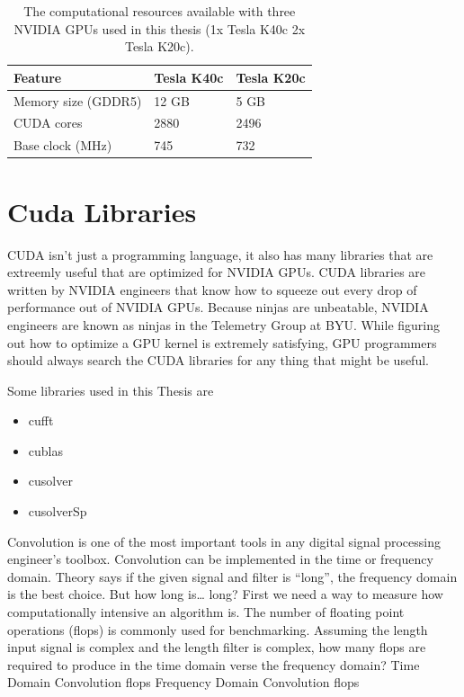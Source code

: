 \begin{table}
\begin{center}
\begin{tabular}{lll}
	\toprule
	Feature 			& Tesla K40c 	& Tesla K20c 	\\ \midrule
	Memory size (GDDR5) & 12 GB 		& 5 GB 			\\
	CUDA cores 			& 2880 			& 2496 			\\
	Base clock (MHz) 	& 745 			& 732 			\\ \bottomrule
\end{tabular}
\end{center}
\caption{The computational resources available with three NVIDIA GPUs used in this thesis (1x Tesla K40c 2x Tesla K20c).}
\label{tab:gpu-resources_jeffs}
\end{table}

\section{Cuda Libraries}
CUDA isn't just a programming language, it also has many libraries that are extreemly useful that are optimized for NVIDIA GPUs.
CUDA libraries are written by NVIDIA engineers that know how to squeeze out every drop of performance out of NVIDIA GPUs.
Because ninjas are unbeatable, NVIDIA engineers are known as ninjas in the Telemetry Group at BYU.
While figuring out how to optimize a GPU kernel is extremely satisfying, GPU programmers should always search the CUDA libraries for any thing that might be useful.

Some libraries used in this Thesis are
\begin{itemize}
  \item cufft
  \item cublas
  \item cusolver
  \item cusolverSp
\end{itemize}


Convolution is one of the most important tools in any digital signal processing engineer’s toolbox. Convolution can be implemented in the time or frequency domain. Theory says if the given signal and filter is “long”, the frequency domain is the best choice. But how long is… long? First we need a way to measure how computationally intensive an algorithm is. The number of floating point operations (flops) is commonly used for benchmarking. Assuming the length input signal is complex and the length filter is complex, how many flops are required to produce in the time domain verse the frequency domain? Time Domain Convolution flops Frequency Domain Convolution flops

